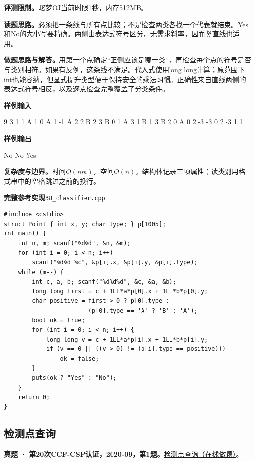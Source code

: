 \documentclass[UTF8,11pt,a4paper,fontset=none]{ctexart}
\begin{document}
\noindent\textbf{评测限制。}曙梦OJ当前时限1秒，内存512MB。

\noindent\textbf{读题思路。}必须把一条线与所有点比较；不是检查两类各找一个代表就结束。Yes和No的大小写要精确。两侧由表达式符号区分，无需求斜率，因而竖直线也适用。

\noindent\textbf{做题思路与解答。}用第一个点确定“正侧应该是哪一类”，再检查每个点的符号是否与类别相符。如果有反例，这条线不满足。代入式使用long long计算；原范围下int也能容纳，但显式提升类型便于保持安全的乘法习惯。正确性来自直线两侧的表达式符号相反，以及逐点检查完整覆盖了分类条件。
\begin{tcolorbox}[samplebox,title={输入输出样例}]
\textbf{样例输入}
\begin{Sample}
9 3
1 1 A
1 0 A
1 -1 A
2 2 B
2 3 B
0 1 A
3 1 B
1 3 B
2 0 A
0 2 -3
-3 0 2
-3 1 1
\end{Sample}
\tcblower
\textbf{样例输出}
\begin{Sample}
No
No
Yes
\end{Sample}
\end{tcolorbox}

\noindent\textbf{复杂度与边界。}时间$O(nm)$，空间$O(n)$。结构体记录三项属性；读类别用格式串中的空格跳过之前的换行。
\par\noindent\begin{minipage}{\linewidth}
\textbf{完整参考实现}\quad\texttt{38\_classifier.cpp}
\begin{lstlisting}
#include <cstdio>
struct Point { int x, y; char type; } p[1005];
int main() {
    int n, m; scanf("%d%d", &n, &m);
    for (int i = 0; i < n; i++)
        scanf("%d%d %c", &p[i].x, &p[i].y, &p[i].type);
    while (m--) {
        int c, a, b; scanf("%d%d%d", &c, &a, &b);
        long long first = c + 1LL*a*p[0].x + 1LL*b*p[0].y;
        char positive = first > 0 ? p[0].type :
                        (p[0].type == 'A' ? 'B' : 'A');
        bool ok = true;
        for (int i = 0; i < n; i++) {
            long long v = c + 1LL*a*p[i].x + 1LL*b*p[i].y;
            if (v == 0 || ((v > 0) != (p[i].type == positive)))
                ok = false;
        }
        puts(ok ? "Yes" : "No");
    }
    return 0;
}
\end{lstlisting}
\end{minipage}\par

\subsection{检测点查询}
\textbf{真题 · 第20次CCF-CSP认证，2020-09，第1题。}\href{https://www.acwing.com/problem/content/3295/}{检测点查询（在线做题）}。
\end{document}
